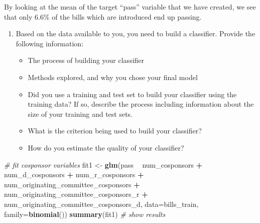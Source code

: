 \documentclass[]{article}
\newenvironment{Shaded}{\begin{snugshade}}{\end{snugshade}}
\newcommand{\KeywordTok}[1]{\textcolor[rgb]{0.13,0.29,0.53}{\textbf{#1}}}
\newcommand{\DataTypeTok}[1]{\textcolor[rgb]{0.13,0.29,0.53}{#1}}
\newcommand{\StringTok}[1]{\textcolor[rgb]{0.31,0.60,0.02}{#1}}
\newcommand{\CommentTok}[1]{\textcolor[rgb]{0.56,0.35,0.01}{\textit{#1}}}
\newcommand{\OperatorTok}[1]{\textcolor[rgb]{0.81,0.36,0.00}{\textbf{#1}}}
\newcommand{\NormalTok}[1]{#1}
\providecommand{\tightlist}{%
  \setlength{\itemsep}{0pt}\setlength{\parskip}{0pt}}
\begin{document}
By looking at the mean of the target ``pass'' variable that we have
created, we see that only 6.6\% of the bills which are introduced end up
passing.

\begin{enumerate}
\def\labelenumi{\arabic{enumi}.}
\setcounter{enumi}{2}
\tightlist
\item
  Based on the data available to you, you need to build a classifier.
  Provide the following information:

  \begin{itemize}
  \tightlist
  \item
    The process of building your classifier
  \item
    Methods explored, and why you chose your final model
  \item
    Did you use a training and test set to build your classifier using
    the training data? If so, describe the process including information
    about the size of your training and test sets.
  \item
    What is the criterion being used to build your classifier?
  \item
    How do you estimate the quality of your classifier?
  \end{itemize}
\end{enumerate}

\begin{Shaded}
\begin{Highlighting}[]
\CommentTok{# fit cosponsor variables}
\NormalTok{fit1 <-}\StringTok{ }\KeywordTok{glm}\NormalTok{(pass }\OperatorTok{~}\StringTok{ }\NormalTok{num_cosponsors }\OperatorTok{+}\StringTok{ }\NormalTok{num_d_cosponsors }\OperatorTok{+}\StringTok{ }\NormalTok{num_r_cosponsors }\OperatorTok{+}\StringTok{ }\NormalTok{num_originating_committee_cosponsors }\OperatorTok{+}\StringTok{ }\NormalTok{num_originating_committee_cosponsors_r }\OperatorTok{+}\StringTok{ }\NormalTok{num_originating_committee_cosponsors_d, }\DataTypeTok{data=}\NormalTok{bills_train, }\DataTypeTok{family=}\KeywordTok{binomial}\NormalTok{())}
\KeywordTok{summary}\NormalTok{(fit1) }\CommentTok{# show results}
\end{Highlighting}
\end{Shaded}
\end{document}
